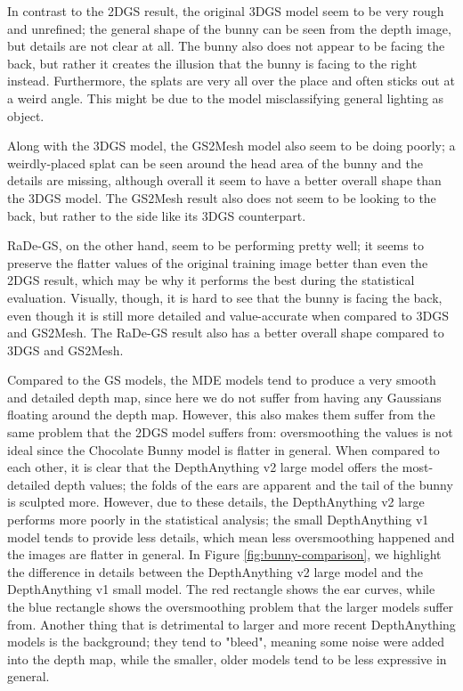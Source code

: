 In contrast to the 2DGS result, the original 3DGS model seem to be very rough and unrefined; the general shape of the bunny can be seen from the depth image, but details are not clear at all. The bunny also does not appear to be facing the back, but rather it creates the illusion that the bunny is facing to the right instead. Furthermore, the splats are very all over the place and often sticks out at a weird angle. This might be due to the model misclassifying general lighting as object. 

Along with the 3DGS model, the GS2Mesh model also seem to be doing poorly; a weirdly-placed splat can be seen around the head area of the bunny and the details are missing, although overall it seem to have a better overall shape than the 3DGS model. The GS2Mesh result also does not seem to be looking to the back, but rather to the side like its 3DGS counterpart.

RaDe-GS, on the other hand, seem to be performing pretty well; it seems to preserve the flatter values of the original training image better than even the 2DGS result, which may be why it performs the best during the statistical evaluation. Visually, though, it is hard to see that the bunny is facing the back, even though it is still more detailed and value-accurate when compared to 3DGS and GS2Mesh. The RaDe-GS result also has a better overall shape compared to 3DGS and GS2Mesh.

Compared to the GS models, the MDE models tend to produce a very smooth and detailed depth map, since here we do not suffer from having any Gaussians floating around the depth map. However, this also makes them suffer from the same problem that the 2DGS model suffers from: oversmoothing the values is not ideal since the Chocolate Bunny model is flatter in general. When compared to each other, it is clear that the DepthAnything v2 large model offers the most-detailed depth values; the folds of the ears are apparent and the tail of the bunny is sculpted more. However, due to these details, the DepthAnything v2 large performs more poorly in the statistical analysis; the small DepthAnything v1 model tends to provide less details, which mean less oversmoothing happened and the images are flatter in general. In Figure \ref{fig:bunny-comparison}, we highlight the difference in details between the DepthAnything v2 large model and the DepthAnything v1 small model. The red rectangle shows the ear curves, while the blue rectangle shows the oversmoothing problem that the larger models suffer from. Another thing that is detrimental to larger and more recent DepthAnything models is the background; they tend to "bleed", meaning some noise were added into the depth map, while the smaller, older models tend to be less expressive in general.

